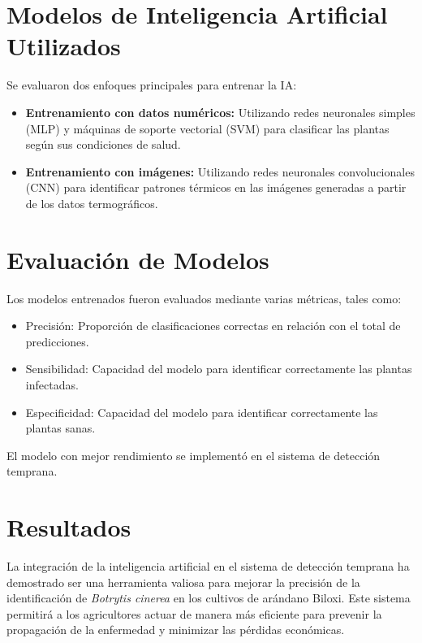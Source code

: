 \section{Modelos de Inteligencia Artificial Utilizados}
Se evaluaron dos enfoques principales para entrenar la IA:
\begin{itemize}
    \item \textbf{Entrenamiento con datos numéricos:} Utilizando redes neuronales simples (MLP) y máquinas de soporte vectorial (SVM) para clasificar las plantas según sus condiciones de salud.
    \item \textbf{Entrenamiento con imágenes:} Utilizando redes neuronales convolucionales (CNN) para identificar patrones térmicos en las imágenes generadas a partir de los datos termográficos.
\end{itemize}

\section{Evaluación de Modelos}
Los modelos entrenados fueron evaluados mediante varias métricas, tales como:
\begin{itemize}
    \item Precisión: Proporción de clasificaciones correctas en relación con el total de predicciones.
    \item Sensibilidad: Capacidad del modelo para identificar correctamente las plantas infectadas.
    \item Especificidad: Capacidad del modelo para identificar correctamente las plantas sanas.
\end{itemize}
El modelo con mejor rendimiento se implementó en el sistema de detección temprana.

\section{Resultados}
La integración de la inteligencia artificial en el sistema de detección temprana ha demostrado ser una herramienta valiosa para mejorar la precisión de la identificación de \textit{Botrytis cinerea} en los cultivos de arándano Biloxi. Este sistema permitirá a los agricultores actuar de manera más eficiente para prevenir la propagación de la enfermedad y minimizar las pérdidas económicas.

